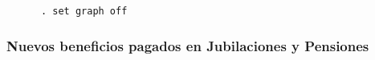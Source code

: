 \begin{verbatim}
      . set graph off
\end{verbatim}

\subsubsection{Nuevos beneficios pagados en Jubilaciones y Pensiones}
